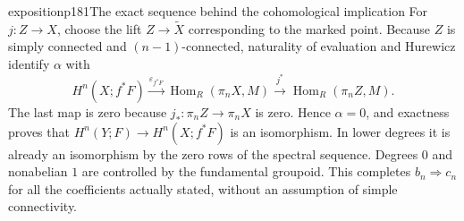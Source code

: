 \begin{dcomment}{exposition}{p181}{The exact sequence behind the cohomological implication}
For $j:Z\to X$, choose the lift $Z\to\widetilde X$ corresponding to the marked point. Because $Z$ is simply connected and $(n-1)$-connected, naturality of evaluation and Hurewicz identify $\alpha$ with
\[
 H^n(X;f^*F)\xrightarrow{\varepsilon_{f^*F}}
 \operatorname{Hom}_R(\pi_nX,M)
 \xrightarrow{j^*}\operatorname{Hom}_R(\pi_nZ,M).
\]
The last map is zero because $j_*:\pi_nZ\to\pi_nX$ is zero. Hence $\alpha=0$, and exactness proves that $H^n(Y;F)\to H^n(X;f^*F)$ is an isomorphism. In lower degrees it is already an isomorphism by the zero rows of the spectral sequence. Degrees $0$ and nonabelian $1$ are controlled by the fundamental groupoid. This completes $b_n\Rightarrow c_n$ for all the coefficients actually stated, without an assumption of simple connectivity.
\end{dcomment}

